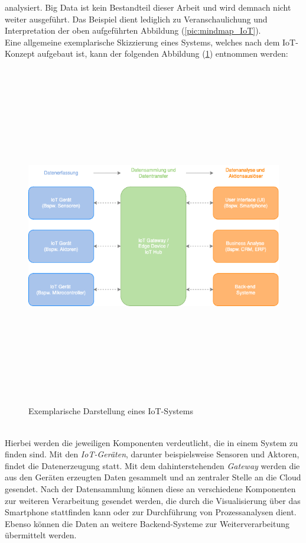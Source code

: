         analysiert. 
        Big Data ist kein Bestandteil dieser Arbeit und wird demnach nicht weiter ausgeführt. Das Beispiel dient lediglich zu Veranschaulichung 
        und Interpretation der oben aufgeführten Abbildung (\ref{pic:mindmap_IoT}).
        \\
        \linebreak
        Eine allgemeine exemplarische Skizzierung eines Systems, welches nach dem \acs{IoT}-Konzept aufgebaut ist, kann der folgenden 
        Abbildung (\ref{pic:skizze_iot}) entnommen werden:
        \begin{figure}[hbt!]
            \centering
            \includegraphics[width=15cm,height=15cm,keepaspectratio]{images/IoT_Grundstruktur.png}
            \caption{Exemplarische Darstellung eines \acs{IoT}-Systems \cite{iotskizze2022}}
            \label{pic:skizze_iot}
        \end{figure}
        \\
        \pagebreak
        \linebreak
        Hierbei werden die jeweiligen Komponenten verdeutlicht, die in einem System zu finden sind. Mit den \textit{IoT-Geräten}, darunter 
        beispielsweise Sensoren und Aktoren, findet die Datenerzeugung statt. Mit dem dahinterstehenden \textit{Gateway} werden die aus den Geräten 
        erzeugten Daten gesammelt und an zentraler Stelle an die Cloud gesendet. Nach der Datensammlung können diese an verschiedene 
        Komponenten zur weiteren Verarbeitung gesendet werden, die durch die Visualisierung über das Smartphone stattfinden kann oder zur Durchführung von 
        Prozessanalysen dient. Ebenso können die Daten an weitere Backend-Systeme zur Weiterverarbeitung übermittelt werden. 

